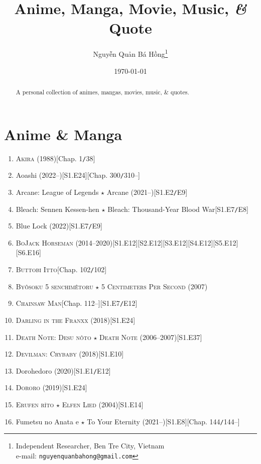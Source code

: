 \documentclass{article}
\title{Anime, Manga, Movie, Music, \textit{\&} Quote}
\author{\selectlanguage{vietnamese} Nguyễn Quản Bá Hồng\footnote{Independent Researcher, Ben Tre City, Vietnam\\e-mail: \texttt{nguyenquanbahong@gmail.com}}}
\date{\today}
\numberwithin{equation}{section}
\begin{document}
\maketitle
\begin{abstract}
	A personal collection of animes, mangas, movies, music, \& quotes.
\end{abstract}
\tableofcontents
\newpage


\section{Anime \& Manga}

\begin{enumerate}
    \item \textsc{Akira} (1988)\hfill[Chap. 1\texttt{/}38]
    \item Aoashi (2022--)\hfill[S1.E24][Chap. 300\texttt{/}310--]
    \item Arcane: League of Legends $\star$ Arcane (2021--)\hfill[S1.E2\texttt{/}E9]
    \item Bleach: Sennen Kessen-hen $\star$ Bleach: Thousand-Year Blood War\hfill[S1.E7\texttt{/}E8]
    \item Blue Lock (2022)\hfill[S1.E7\texttt{/}E9]
    \item \textsc{BoJack Horseman} (2014--2020)\hfill[S1.E12][S2.E12][S3.E12][S4.E12][S5.E12][S6.E16]
    \item \textsc{Buttobi Itto}\hfill[Chap. 102\texttt{/}102]
    \item \textsc{By\^osoku 5 senchimêtoru $\star$ 5 Centimeters Per Second} (2007)
    \item \textsc{Chainsaw Man}\hfill[Chap. 112--][S1.E7\texttt{/}E12]
    \item \textsc{Darling in the Franxx} (2018)\hfill[S1.E24]
    \item \textsc{Death Note: Desu n\^oto $\star$ Death Note} (2006--2007)\hfill[S1.E37]
    \item \textsc{Devilman: Crybaby} (2018)\hfill[S1.E10]
    \item Dorohedoro (2020)\hfill[S1.E1\texttt{/}E12]
    \item \textsc{Dororo} (2019)\hfill[S1.E24]
    \item \textsc{Erufen r\^{\i}to $\star$ Elfen Lied} (2004)\hfill[S1.E14]
    \item Fumetsu no Anata e $\star$ To Your Eternity (2021--)\hfill[S1.E8][Chap. 144\texttt{/}144--]

\end{enumerate}
\end{document}
